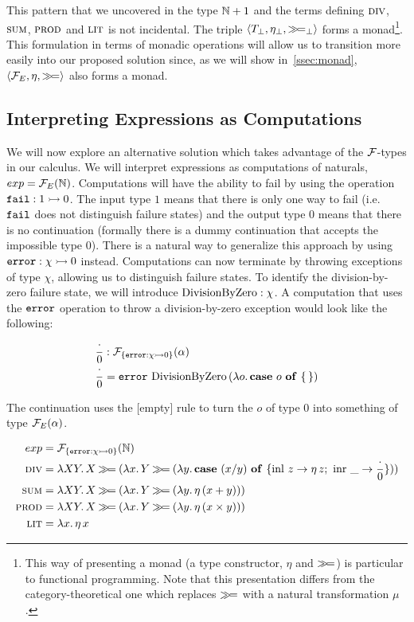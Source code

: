 This pattern that we uncovered in the type $\mathbb{N} + 1$ and the terms defining
$\textsc{div}$, $\textsc{sum}$, $\textsc{prod}$ and $\textsc{lit}$ is not incidental. The triple
$\left<T_\bot, \eta_\bot, \mathbin{\gg\!=}_\bot \right>$ forms a monad\footnote{This
  way of presenting a monad (a type constructor, $\eta$ and $\mathbin{\gg\!=}$) is
  particular to functional programming. Note that this presentation differs
  from the category-theoretical one which replaces $\mathbin{\gg\!=}$ with a natural
  transformation $\mu$ \cite{mac1978categories}.}. This formulation in
terms of monadic operations will allow us to transition more easily into
our proposed solution since, as we will show in~\ref{ssec:monad},
$\left< \mathcal{F}_E, \eta, \mathbin{\gg\!=} \right>$ also forms a monad.

\subsection{Interpreting Expressions as Computations}

We will now explore an alternative solution which takes advantage of the
$\mathcal{F}$-types in our calculus. We will interpret expressions as computations
of naturals, $exp = \mathcal{F}_E(\mathbb{N})$. Computations will have the ability to fail
by using the operation $\mathtt{fail} : 1 \rightarrowtail 0$. The input type $1$ means
that there is only one way to fail (i.e.\ $\mathtt{fail}$ does not distinguish
failure states) and the output type $0$ means that there is no continuation
(formally there is a dummy continuation that accepts the impossible type
$0$). There is a natural way to generalize this approach by using
$\mathtt{error} : \chi \rightarrowtail 0$ instead. Computations can now terminate by
throwing exceptions of type $\chi$, allowing us to distinguish failure
states. To identify the division-by-zero failure state, we will introduce
$\operatorname{DivisionByZero} : \chi$. A computation that uses the $\mathtt{error}$ operation to
throw a division-by-zero exception would look like the following:

\begin{align*}
  \frac{\cdot}{0} &: \mathcal{F}_{\{\mathtt{error} : \chi \rightarrowtail 0\}}(\alpha) \\
  \frac{\cdot}{0} &= \mathtt{error}\,\operatorname{DivisionByZero}\,(\lambda o.\, \text{\textbf{case} $o$ \textbf{of} \{\,\}})
\end{align*}

The continuation uses the [empty] rule to turn the $o$ of type $0$ into
something of type $\mathcal{F}_E(\alpha)$.

\begin{align*}
  exp &= \mathcal{F}_{\{\mathtt{error} : \chi \rightarrowtail 0\}}(\mathbb{N}) \\
  \textsc{div} &= \lambda X Y.\, X \mathbin{\gg\!=} (\lambda x.\, Y \mathbin{\gg\!=} (\lambda y.\, \text{\textbf{case} $(x / y)$ \textbf{of} $\{ \operatorname{inl}\,z \to \eta\,z;\ \operatorname{inr}\,\_ \to \frac{\cdot}{0} \}$})) \\
  \textsc{sum} &= \lambda X Y.\, X \mathbin{\gg\!=} (\lambda x.\, Y \mathbin{\gg\!=} (\lambda y.\, \eta\,(x + y))) \\
  \textsc{prod} &= \lambda X Y.\, X \mathbin{\gg\!=} (\lambda x.\, Y \mathbin{\gg\!=} (\lambda y.\, \eta\,(x \times y))) \\
  \textsc{lit} &= \lambda x.\, \eta\,x
\end{align*}


